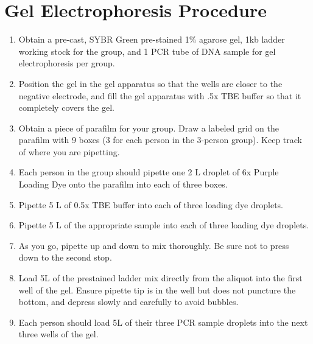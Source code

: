 \documentclass[letterpaper]{article}
\newcommand{\uL}{\micro{}L}
\begin{document}
\section{Gel Electrophoresis Procedure}
\begin{enumerate}
\item{Obtain a pre-cast, SYBR Green pre-stained 1\% agarose gel, 1kb ladder working stock for the group, and 1 PCR tube of DNA sample for gel electrophoresis per group.} 
\item{Position the gel in the gel apparatus so that the wells are closer to the negative electrode, and fill the gel apparatus with .5x TBE buffer so that it completely covers the gel.}
\item{Obtain a piece of parafilm for your group. Draw a labeled grid on the parafilm with 9 boxes (3 for each person in the 3-person group). Keep track of where you are pipetting.} 
\item{Each person in the group should pipette one 2 \uL{} droplet of 6x Purple Loading Dye onto the parafilm into each of three boxes.}
\item{Pipette 5 \uL{} of 0.5x TBE buffer into each of three loading dye droplets.}
\item{Pipette 5 \uL{} of the appropriate sample into each of three loading dye droplets.}
\item{As you go, pipette up and down to mix thoroughly. Be sure not to press down to the second stop.}
\item{Load 5\uL{} of the prestained ladder mix directly from the aliquot into the first well of the gel. Ensure pipette tip is in the well but does not puncture the bottom, and depress slowly and carefully to avoid bubbles.}
\item{Each person should load 5\uL{} of their three PCR sample droplets into the next three wells of the gel.}


\end{enumerate}
\end{document}
